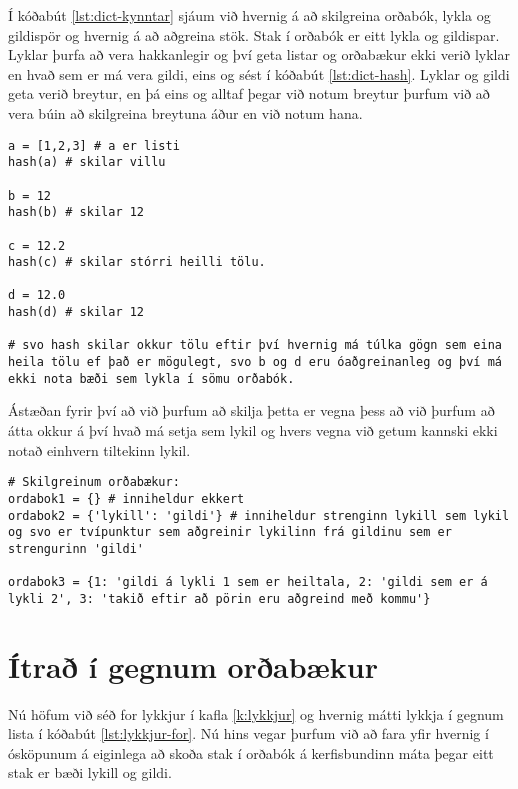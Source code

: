 Í kóðabút \ref{lst:dict-kynntar} sjáum við hvernig á að skilgreina orðabók, lykla og gildispör og hvernig á að aðgreina stök.
Stak í orðabók er eitt lykla og gildispar.
Lyklar þurfa að vera hakkanlegir og því geta listar og orðabækur ekki verið lyklar en hvað sem er má vera gildi, eins og sést í kóðabút \ref{lst:dict-hash}.
Lyklar og gildi geta verið breytur, en þá eins og alltaf þegar við notum breytur þurfum við að vera búin að skilgreina breytuna áður en við notum hana.

\begin{lstlisting}[caption=Skoðum id() og hash(), label=lst:dict-hash]
a = [1,2,3] # a er listi
hash(a) # skilar villu 

b = 12 
hash(b) # skilar 12

c = 12.2
hash(c) # skilar stórri heilli tölu.

d = 12.0
hash(d) # skilar 12 

# svo hash skilar okkur tölu eftir því hvernig má túlka gögn sem eina heila tölu ef það er mögulegt, svo b og d eru óaðgreinanleg og því má ekki nota bæði sem lykla í sömu orðabók.
\end{lstlisting}

Ástæðan fyrir því að við þurfum að skilja þetta er vegna þess að við þurfum að átta okkur á því hvað má setja sem lykil og hvers vegna við getum kannski ekki notað einhvern tiltekinn lykil.

\begin{lstlisting}[caption=Orðabækur kynntar, label=lst:dict-kynntar]
# Skilgreinum orðabækur:
ordabok1 = {} # inniheldur ekkert
ordabok2 = {'lykill': 'gildi'} # inniheldur strenginn lykill sem lykil og svo er tvípunktur sem aðgreinir lykilinn frá gildinu sem er strengurinn 'gildi'

ordabok3 = {1: 'gildi á lykli 1 sem er heiltala, 2: 'gildi sem er á lykli 2', 3: 'takið eftir að pörin eru aðgreind með kommu'}
\end{lstlisting}

\section{Ítrað í gegnum orðabækur}

Nú höfum við séð for lykkjur í kafla \ref{k:lykkjur} og hvernig mátti lykkja í gegnum lista í kóðabút \ref{lst:lykkjur-for}.
Nú hins vegar þurfum við að fara yfir hvernig í ósköpunum á eiginlega að skoða stak í orðabók á kerfisbundinn máta þegar eitt stak er bæði lykill og gildi.

